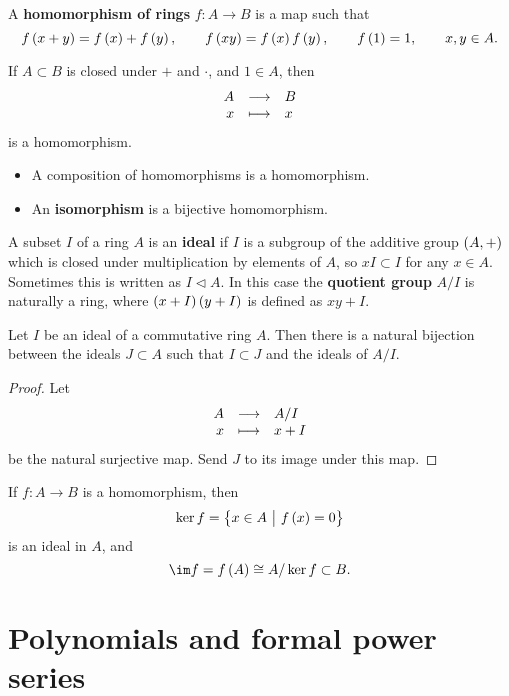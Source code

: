 \begin{definition}
A \textbf{homomorphism of rings} $ f : A \to B $ is a map such that
$$ f\br{x + y} = f\br{x} + f\br{y}, \qquad f\br{xy} = f\br{x}f\br{y}, \qquad f\br{1} = 1, \qquad x, y \in A. $$
\end{definition}

\begin{example*}
If $ A \subset B $ is closed under $ + $ and $ \cdot $, and $ 1 \in A $, then
$$ \function{A}{B}{x}{x} $$
is a homomorphism.
\end{example*}

\begin{remark}
\hfill
\begin{itemize}
\item A composition of homomorphisms is a homomorphism.
\item An \textbf{isomorphism} is a bijective homomorphism.
\end{itemize}
\end{remark}

\begin{definition}
A subset $ I $ of a ring $ A $ is an \textbf{ideal} if $ I $ is a subgroup of the additive group $ \br{A, +} $ which is closed under multiplication by elements of $ A $, so $ xI \subset I $ for any $ x \in A $. Sometimes this is written as $ I \triangleleft A $. In this case the \textbf{quotient group} $ A / I $ is naturally a ring, where $ \br{x + I}\br{y + I} $ is defined as $ xy + I $.
\end{definition}

\begin{proposition}
Let $ I $ be an ideal of a commutative ring $ A $. Then there is a natural bijection between the ideals $ J \subset A $ such that $ I \subset J $ and the ideals of $ A / I $.
\end{proposition}

\begin{proof}
Let
$$ \function{A}{A / I}{x}{x + I} $$
be the natural surjective map. Send $ J $ to its image under this map.
\end{proof}

\begin{definition}
If $ f : A \to B $ is a homomorphism, then
$$ \ker f = \cbr{x \in A \st f\br{x} = 0} $$
is an ideal in $ A $, and
$$ \im f = f\br{A} \cong A / \ker f \subset B. $$
\end{definition}

\pagebreak

\section{Polynomials and formal power series}

